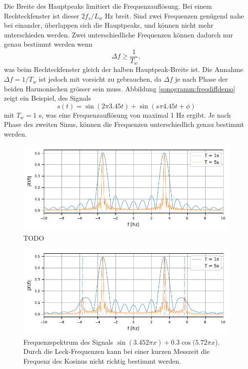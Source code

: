 Die Breite des Hauptpeaks limitiert die Frequenzauflösung.
Bei einem Rechteckfenster ist dieser $2f_s/L_w$ Hz breit.
Sind zwei Frequenzen genügend nahe bei einander, überlappen sich die Hauptpeaks, und können
nicht mehr unterschieden werden. 
Zwei unterschiedliche Frequenzen können dadurch nur genau bestimmt werden wenn
\begin{equation}
    \Delta f \geq \frac{1}{T_w},
\end{equation}
was beim Rechteckfenster gleich der halben Hauptpeak-Breite ist.
Die Annahme $\Delta f = 1/T_w$ ist jedoch mit vorsicht zu gebrauchen, da $\Delta f$ je nach 
Phase der beiden Harmonischen grösser sein muss.
Abbildung \ref{sonogramm:freqdiffdemo} zeigt ein Beispiel, des Signals
\begin{equation}
    s(t) = \sin(2\pi 3.45 t ) + \sin (s\pi 4.45 t + \phi)
\end{equation}
mit $T_w = 1$ s, was eine Frequenzauflösung von maximal 1 Hz ergibt.
Je nach Phase des zweiten Sinus, können die Frequenzen unterschiedlich genau
bestimmt werden.


\begin{figure}
    \centering
    \includegraphics{papers/sonogramm/images/RectWinHarmEx.pdf}
    \caption{TODO
    \label{sonogramm:leakageDemo}
    }
\end{figure}

\begin{figure}
    \centering
    \includegraphics{papers/sonogramm/images/twohamrrect.pdf}
    \caption{Frequenzspektrum des Signals $\sin(3.45 2\pi x) + 0.3  \cos(5.7  2\pi x$).
    Durch die Leck-Frequenzen kann bei einer kurzen Messzeit die Frequenz des Kosinus 
    nicht richtig bestimmt werden.
    \label{sonogramm:leakageDemo2}
    }
\end{figure}

